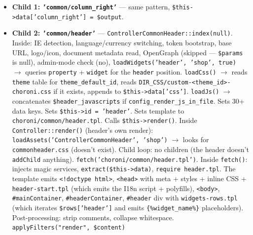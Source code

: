 \documentclass[11pt,a4paper]{article}
\begin{document}
\begin{enumerate}[leftmargin=1.6em,itemsep=2pt]
\begin{itemize}[itemsep=2pt]
                \texttt{\$this->data['column\_left'] = \$output}.
          \item \textbf{Child 1: \texttt{'common/column\_right'}} ---
                same pattern,
                \texttt{\$this->data['column\_right'] = \$output}.
          \item \textbf{Child 2: \texttt{'common/header'}} ---
                \texttt{ControllerCommonHeader::index(null)}.
                Inside: IE detection, language/currency switching,
                token bootstrap, base URL, logo/icon, document
                metadata read, OpenGraph (skipped ---
                \texttt{\$params} is null), admin-mode check (no),
                \texttt{loadWidgets('header', 'shop', true)} $\to$
                queries \texttt{property} + \texttt{widget} for the
                \texttt{header} position. \texttt{loadCss()} $\to$
                reads \texttt{theme} table for
                \texttt{theme\_default\_id}, reads
                \texttt{DIR\_CSS/custom-<theme\_id>-choroni.css}
                if it exists, appends to
                \texttt{\$this->data['css']}. \texttt{loadJs()} $\to$
                concatenates \texttt{\$header\_javascripts} if
                \texttt{config\_render\_js\_in\_file}. Sets 30+
                data keys. Sets \texttt{\$this->id = 'header'}.
                Sets template to
                \texttt{choroni/common/header.tpl}. Calls
                \texttt{\$this->render()}. Inside
                \texttt{Controller::render()} (header's own
                render): \texttt{loadAssets('ControllerCommonHeader', 'shop')}
                $\to$ looks for \texttt{commonheader.css} (doesn't
                exist). Child loop: no children (the header
                doesn't \texttt{addChild} anything).
                \texttt{fetch('choroni/common/header.tpl')}.
                Inside \texttt{fetch()}: injects magic services,
                \texttt{extract(\$this->data)}, \texttt{require header.tpl}.
                The template emits \texttt{<!doctype html>},
                \texttt{<head>} with meta + styles + inline CSS +
                \texttt{header-start.tpl} (which emits the I18n
                script + polyfills), \texttt{<body>},
                \texttt{\#mainContainer}, \texttt{\#headerContainer},
                \texttt{\#header} div with \texttt{widgets-rows.tpl}
                (which iterates \texttt{\$rows['header']} and emits
                \texttt{\{\%widget\_name\%\}} placeholders).
                Post-processing: strip comments, collapse
                whitespace. \texttt{applyFilters("render", \$content)}

\end{itemize}
\end{enumerate}
\end{document}
